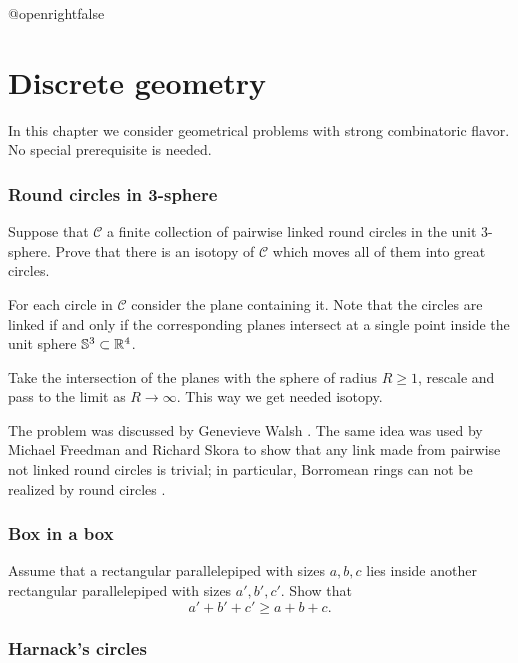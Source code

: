 \csname @openrightfalse\endcsname
\chapter{Discrete geometry}

In this chapter we consider geometrical problems with strong combinatoric flavor.
No special prerequisite is needed.

\subsection*{Round circles in 3-sphere}\label{Round circles}

\begin{pr}
Suppose that $\mathcal{C}$ a finite collection of pairwise linked round circles in the unit 3-sphere. 
Prove that there is an isotopy of $\mathcal{C}$
which moves all of them into great circles.
\end{pr}


For each circle in $\mathcal{C}$ consider the plane containing it.
Note that the circles are linked 
if and only if 
the corresponding planes intersect at a single point inside the unit sphere $\mathbb{S}^3\subset \mathbb{R}^4$.

Take the intersection of the planes with the sphere of radius $R\ge 1$,
rescale and pass to the limit as $R\to\infty$.  
This way we get needed isotopy.\qeds

The problem was discussed 
by Genevieve Walsh \cite[see][]{walsh}.
The same idea was used by Michael Freedman and  Richard Skora to show that any link made from pairwise not linked round circles is trivial; 
in particular, Borromean rings can not be realized by round circles
\cite[see Lemma 3.2 in ][]{freedman-skora}.

\subsection*{Box in a box}\label{box-in-box}

\begin{pr}
Assume that a rectangular parallelepiped with sizes $a,b,c$ 
lies inside another rectangular parallelepiped with sizes $a',b',c'$. 
Show that 
\[a'+b'+c'\ge a+b+c.\]

\end{pr}

\subsection*{Harnack's circles}\label{Harnack}

